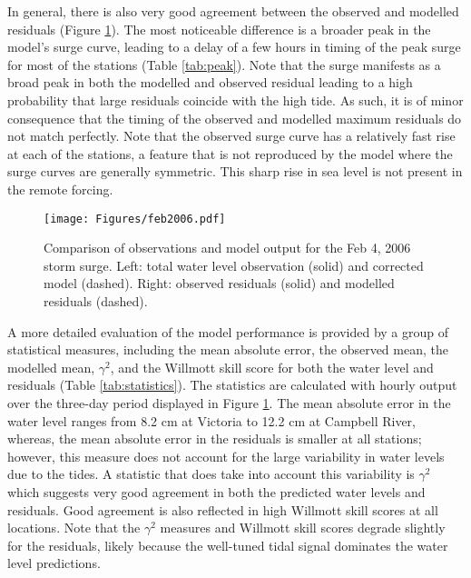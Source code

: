 \documentclass[letterpaper]{tATO2e}
\begin{document}
In general, there is also very good agreement between the observed and modelled residuals (Figure \ref{fig:feb2006}). {\color{red} The most noticeable difference is a broader peak in the model's surge curve, leading to a delay of a few hours in timing of the peak surge for most of the stations (Table \ref{tab:peak}). Note that the surge manifests as a broad peak in both the modelled and observed residual leading to a high probability that large residuals coincide with the high tide.} As such, it is of minor consequence that the timing of the observed and modelled maximum residuals do not match perfectly. {\color{red}Note that the observed surge curve has a relatively fast rise at each of the stations, a feature that is not reproduced by the model where the surge curves are generally symmetric. This sharp rise in sea level is not present in the remote forcing.  }

\begin{figure}
\centering
\texttt{[image: Figures/feb2006.pdf]}
\caption{Comparison of observations and model output for the Feb 4, 2006 storm surge. Left: total water level observation (solid) and corrected model (dashed). Right: observed residuals (solid) and modelled residuals (dashed).}
\label{fig:feb2006}
\end{figure}

A more detailed evaluation of the model performance is provided by a group of statistical measures, including the mean absolute error, the observed mean, the modelled mean, $\gamma^2$, and the Willmott skill score for both the water level and residuals (Table \ref{tab:statistics}). The statistics are calculated with hourly output over the three-day period displayed in Figure \ref{fig:feb2006}. The mean absolute error in the water level ranges from {\color{red}8.2 cm} at Victoria to {\color{red}12.2} cm at Campbell River, whereas, the mean absolute error in the residuals is smaller at all stations; however, this measure does not account for the large variability in water levels due to the tides. A statistic that does take into account this variability is $\gamma^2$ which suggests very good agreement in both the predicted water levels and residuals. Good agreement is also reflected in high Willmott skill scores at all locations. Note that the $\gamma^2$ measures and Willmott skill scores degrade slightly for the residuals, likely because the well-tuned tidal signal dominates the water level predictions.
\end{document}
